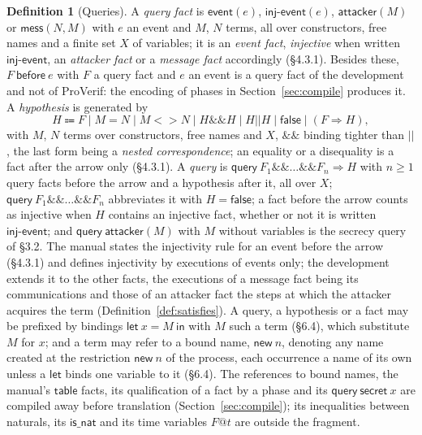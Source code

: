 \documentclass[11pt]{article}
\theoremstyle{definition}
\newtheorem{definition}{Definition}[section]
\theoremstyle{plain}
\theoremstyle{remark}
\begin{document}
\begin{definition}[Queries]\label{def:queries}
A \emph{query fact} is $\mathsf{event}(e)$, $\mathsf{inj\text{-}event}(e)$, $\mathsf{attacker}(M)$ or $\mathsf{mess}(N,M)$ with $e$ an event and $M$, $N$ terms, all over constructors, free names and a finite set $X$ of variables; it is an \emph{event fact}, \emph{injective} when written $\mathsf{inj\text{-}event}$, an \emph{attacker fact} or a \emph{message fact} accordingly (\S4.3.1). Besides these, $F\ \mathsf{before}\ e$ with $F$ a query fact and $e$ an event is a query fact of the development and not of ProVerif: the encoding of phases in Section~\ref{sec:compile} produces it. A \emph{hypothesis} is generated by
\[
H\Coloneqq F\mid M=N\mid M\mathbin{<>}N\mid H\mathbin{\&\&}H\mid H\mathbin{||}H\mid\mathsf{false}\mid(F\Longrightarrow H),
\]
with $M$, $N$ terms over constructors, free names and $X$, $\mathbin{\&\&}$ binding tighter than $||$, the last form being a \emph{nested correspondence}; an equality or a disequality is a fact after the arrow only (\S4.3.1). A \emph{query} is $\mathsf{query}\ F_1\mathbin{\&\&}\dots\mathbin{\&\&}F_n\Longrightarrow H$ with $n\ge1$ query facts before the arrow and a hypothesis after it, all over $X$; $\mathsf{query}\ F_1\mathbin{\&\&}\dots\mathbin{\&\&}F_n$ abbreviates it with $H=\mathsf{false}$; a fact before the arrow counts as injective when $H$ contains an injective fact, whether or not it is written $\mathsf{inj\text{-}event}$; and $\mathsf{query}\ \mathsf{attacker}(M)$ with $M$ without variables is the secrecy query of \S3.2. The manual states the injectivity rule for an event before the arrow (\S4.3.1) and defines injectivity by executions of events only; the development extends it to the other facts, the executions of a message fact being its communications and those of an attacker fact the steps at which the attacker acquires the term (Definition~\ref{def:satisfies}). A query, a hypothesis or a fact may be prefixed by bindings $\mathsf{let}\ x=M\ \mathsf{in}$ with $M$ such a term (\S6.4), which substitute $M$ for $x$; and a term may refer to a bound name, $\mathsf{new}\ n$, denoting any name created at the restriction $\mathsf{new}\ n$ of the process, each occurrence a name of its own unless a $\mathsf{let}$ binds one variable to it (\S6.4). The references to bound names, the manual's $\mathsf{table}$ facts, its qualification of a fact by a phase and its $\mathsf{query}\ \mathsf{secret}\ x$ are compiled away before translation (Section~\ref{sec:compile}); its inequalities between naturals, its $\mathsf{is\_nat}$ and its time variables $F@t$ are outside the fragment.
\end{definition}
\end{document}
